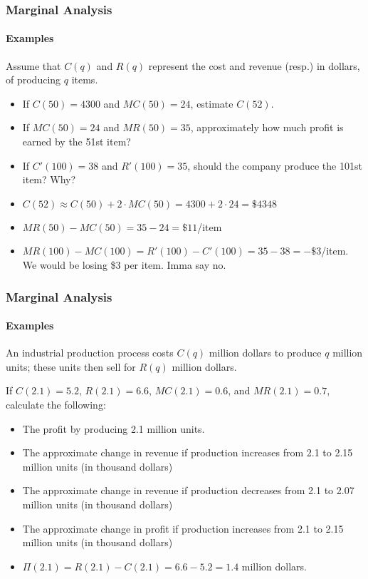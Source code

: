 \documentclass[9pt,xcolor=x11names,compress]{beamer}
\begin{document}
\begin{frame}\frametitle{Marginal Analysis}
\framesubtitle{Examples}
\begin{example}
Assume that $C(q)$ and $R(q)$ represent the cost and revenue (resp.) in dollars, of producing $q$ items. 
\begin{itemize}
	\item \alert<2>{If $C(50)=4300$ and $MC(50)=24$, estimate $C(52)$.}
	\item \alert<3>{If $MC(50)=24$ and $MR(50)=35$, approximately how much profit is earned by the 51st item?}
	\item \alert<4>{If $C'(100)=38$ and $R'(100)=35$, should the company produce the 101st item?  Why?}
\end{itemize}
\end{example}
\pause\begin{itemize}[<+->]
	\item $C(52)\approx C(50)+2\cdot MC(50) = 4300+2\cdot 24 =\$4348$
	\item $MR(50)-MC(50)=35-24=\$11$/item
	\item $MR(100)-MC(100)=R'(100)-C'(100)=35-38=-\$3$/item.  We would be losing \$3 per item.  Imma say \alert{no}.
\end{itemize}
\end{frame}

\begin{frame}\frametitle{Marginal Analysis}
\framesubtitle{Examples}
\begin{example}
	An industrial production process costs $C(q)$ million dollars to produce $q$ million units; these units then sell for $R(q)$ million dollars.

	If $C(2.1)=5.2$, $R(2.1)=6.6$, $MC(2.1)=0.6$, and $MR(2.1)=0.7$, calculate the following:
	\begin{itemize}
		\item \alert<2>{The profit by producing 2.1 million units.}
		\item The approximate change in revenue if production increases from 2.1 to 2.15 million units (in thousand dollars)
		\item The approximate change in revenue if production decreases from 2.1 to 2.07 million units (in thousand dollars)
		\item The approximate change in profit if production increases from 2.1 to 2.15 million units (in thousand dollars)
	\end{itemize}
\end{example}
\pause \begin{itemize}
	\item $\Pi(2.1)=R(2.1)-C(2.1)=6.6-5.2=1.4$ million dollars.
	\end{itemize}
\end{frame}
\end{document}
